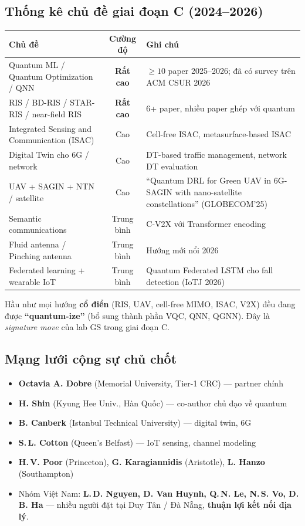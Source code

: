\documentclass[11pt,a4paper]{article}
\begin{document}
\subsection{Thống kê chủ đề giai đoạn C (2024--2026)}

\begin{longtable}{@{}p{6.5cm} c p{7cm}@{}}
\toprule
\textbf{Chủ đề} & \textbf{Cường độ} & \textbf{Ghi chú} \\
\midrule
\endhead
Quantum ML / Quantum Optimization / QNN & \textbf{Rất cao} & $\geq 10$ paper 2025--2026; đã có survey trên ACM CSUR 2026 \\
RIS / BD-RIS / STAR-RIS / near-field RIS & \textbf{Rất cao} & 6+ paper, nhiều paper ghép với quantum \\
Integrated Sensing and Communication (ISAC) & Cao & Cell-free ISAC, metasurface-based ISAC \\
Digital Twin cho 6G / network & Cao & DT-based traffic management, network DT evaluation \\
UAV + SAGIN + NTN / satellite & Cao & ``Quantum DRL for Green UAV in 6G-SAGIN with nano-satellite constellations'' (GLOBECOM'25) \\
Semantic communications & Trung bình & C-V2X với Transformer encoding \\
Fluid antenna / Pinching antenna & Trung bình & Hướng mới nổi 2026 \\
Federated learning + wearable IoT & Trung bình & Quantum Federated LSTM cho fall detection (IoTJ 2026) \\
\bottomrule
\end{longtable}

\begin{keybox}
Hầu như mọi hướng \textbf{cổ điển} (RIS, UAV, cell-free MIMO, ISAC, V2X) đều đang được \textbf{``quantum-ize''} (bổ sung thành phần VQC, QNN, QGNN). Đây là \textit{signature move} của lab GS trong giai đoạn C.
\end{keybox}

\subsection{Mạng lưới cộng sự chủ chốt}

\begin{itemize}
  \item \textbf{Octavia A. Dobre} (Memorial University, Tier-1 CRC) --- partner chính
  \item \textbf{H. Shin} (Kyung Hee Univ., Hàn Quốc) --- co-author chủ đạo về quantum
  \item \textbf{B. Canberk} (Istanbul Technical University) --- digital twin, 6G
  \item \textbf{S.\,L. Cotton} (Queen's Belfast) --- IoT sensing, channel modeling
  \item \textbf{H.\,V. Poor} (Princeton), \textbf{G. Karagiannidis} (Aristotle), \textbf{L. Hanzo} (Southampton)
  \item Nhóm Việt Nam: \textbf{L.\,D. Nguyen, D. Van Huynh, Q.\,N. Le, N.\,S. Vo, D.\,B. Ha} --- nhiều người đặt tại Duy Tân / Đà Nẵng, \textbf{thuận lợi kết nối địa lý}.
\end{itemize}
\end{document}
